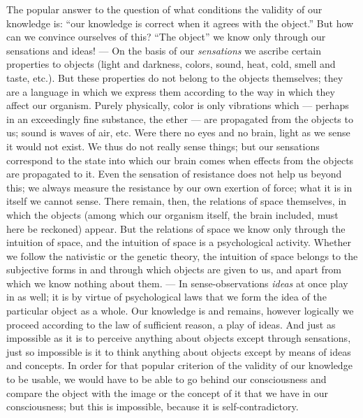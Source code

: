 \documentclass[12pt,a4paper]{book}
\newcommand{\opage}[1]{\marginnote{\footnotesize\textit{[#1]}}}
\begin{document}
The popular answer to the question of what conditions the validity of our
knowledge is: ``our knowledge is correct when it agrees with the
object.'' But how can we convince ourselves of this? ``The object'' we
know only through our sensations and ideas! --- On the basis of our
\emph{sensations} we ascribe certain properties to objects (light and
darkness, colors, sound, heat, cold, smell and taste, etc.). But these
properties do not belong to the objects themselves; they are a language
in which we express them according to the way in which they affect our
organism. Purely physically, color is only vibrations which --- perhaps
in an exceedingly fine substance, the ether --- are propagated from the
objects to us; sound is waves of air, etc. Were there no eyes and no
brain, light as we sense it would not exist. We thus do not really sense
things; but our sensations correspond to the state into which our brain
comes when effects from the objects are propagated to it. Even the
sensation of resistance does not help us beyond this; we always measure
the resistance by our own exertion of force; what it is in itself we
cannot sense. There remain, then, the relations of space themselves, in
which the objects (among which our organism itself, the brain included,
must here be reckoned) appear. But
\opage{265}the relations of space we know only through the intuition of
space, and the intuition of space is a psychological activity. Whether
we follow the nativistic or the genetic theory, the intuition of space
belongs to the subjective forms in and through which objects are given to
us, and apart from which we know nothing about them. --- In
sense-observations \emph{ideas} at once play in as well; it is by virtue
of psychological laws that we form the idea of the particular object as a
whole. Our knowledge is and remains, however logically we proceed
according to the law of sufficient reason, a play of ideas. And just as
impossible as it is to perceive anything about objects except through
sensations, just so impossible is it to think anything about objects
except by means of ideas and concepts. In order for that popular
criterion of the validity of our knowledge to be usable, we would have
to be able to go behind our consciousness and compare the object with
the image or the concept of it that we have in our consciousness; but
this is impossible, because it is self-contradictory.
\end{document}
